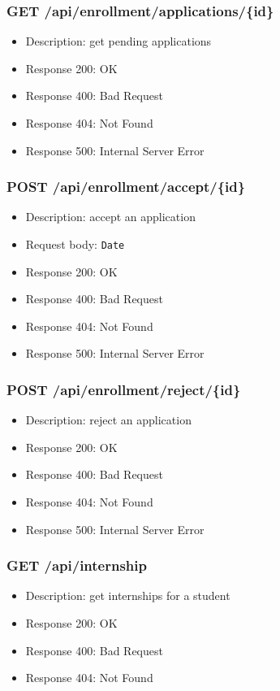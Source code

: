 \subsubsection{GET /api/enrollment/applications/\{id\}}
\begin{itemize}
    \item Description: get pending applications
    \item Response 200: OK
    \item Response 400: Bad Request
    \item Response 404: Not Found
    \item Response 500: Internal Server Error
\end{itemize}

\subsubsection{POST /api/enrollment/accept/\{id\}}
\begin{itemize}
    \item Description: accept an application
    \item Request body: \verb|Date|
    \item Response 200: OK
    \item Response 400: Bad Request
    \item Response 404: Not Found
    \item Response 500: Internal Server Error
\end{itemize}

\subsubsection{POST /api/enrollment/reject/\{id\}}
\begin{itemize}
    \item Description: reject an application
    \item Response 200: OK
    \item Response 400: Bad Request
    \item Response 404: Not Found
    \item Response 500: Internal Server Error
\end{itemize}

\subsubsection{GET /api/internship}
\begin{itemize}
    \item Description: get internships for a student
    \item Response 200: OK
    \item Response 400: Bad Request
    \item Response 404: Not Found
\end{itemize}

